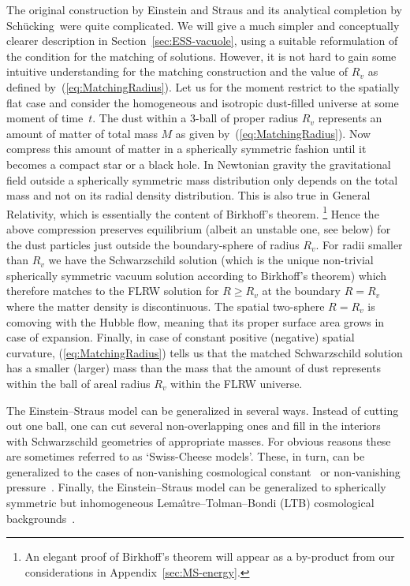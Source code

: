 \documentclass
[rmp,aps,twocolumn,showpacs,preprintnumbers,amsmath,amssymb]{revtex4}
\theoremstyle{plain}
\theoremstyle{definition}
\theoremstyle{remark}
\newcommand{\Lemaitre}{Lema\^{\i}tre}
\newcommand{\Schuecking}{Sch\"ucking}
\begin{document}
The original construction by Einstein and Straus and its analytical 
completion by \Schuecking\ were quite complicated. We will give a 
much simpler and conceptually clearer description in 
Section~\ref{sec:ESS-vacuole}, using a suitable reformulation of the 
condition for the matching of solutions.  However, it is not hard to 
gain some intuitive understanding for the matching construction and 
the value of $R_v$ as defined by~(\ref{eq:MatchingRadius}). 
Let us for the moment restrict to the spatially flat case and consider 
the homogeneous and isotropic dust-filled universe at some moment of 
time~$t$. The dust within a 3-ball of proper radius $R_v$ represents an 
amount of matter of total mass $M$ as given by~(\ref{eq:MatchingRadius}). 
Now compress this amount of matter in a spherically symmetric fashion 
until it becomes a compact star or a black hole. In Newtonian gravity 
the gravitational field outside a spherically symmetric mass 
distribution only depends on the total mass and not on its radial 
density distribution. This is also true in General Relativity, 
which is essentially the content of Birkhoff's theorem.%
\footnote{An elegant proof of Birkhoff's theorem will appear as a 
by-product from our considerations in Appendix~\ref{sec:MS-energy}.} 
Hence the above compression preserves equilibrium (albeit an unstable 
one, see below) for the dust particles just outside the boundary-sphere of 
radius $R_v$. For radii smaller than $R_v$ we have the Schwarzschild 
solution (which is the unique non-trivial spherically symmetric 
vacuum solution according to Birkhoff's theorem) which therefore 
matches to the FLRW solution for $R \geq R_v$ at the boundary $R=R_v$ 
where the matter density is discontinuous. The spatial two-sphere 
$R=R_v$ is comoving with the Hubble flow, meaning that its proper 
surface area grows in case of expansion. Finally, in case of constant 
positive (negative) spatial curvature, (\ref{eq:MatchingRadius}) tells us 
that the matched Schwarzschild solution has a smaller (larger) mass than 
the mass that the amount of dust represents within the ball of areal 
radius $R_v$ within the FLRW universe. 

The Einstein--Straus model can be generalized in several ways. 
Instead of cutting out one ball, one can cut several non-overlapping ones 
and fill in the interiors with Schwarzschild geometries of appropriate 
masses. For obvious reasons these are sometimes referred to as 
`Swiss-Cheese models'. These, in turn, can be generalized to the cases of 
non-vanishing cosmological constant~\cite{Balbinot.etal:1988} or non-vanishing 
pressure~\cite{Bona.Stela:1987}. Finally, the Einstein--Straus model can be 
generalized to spherically symmetric but inhomogeneous 
\Lemaitre--Tolman--Bondi (LTB) cosmological backgrounds~\cite{Bonnor:2000b}. 
\end{document}
